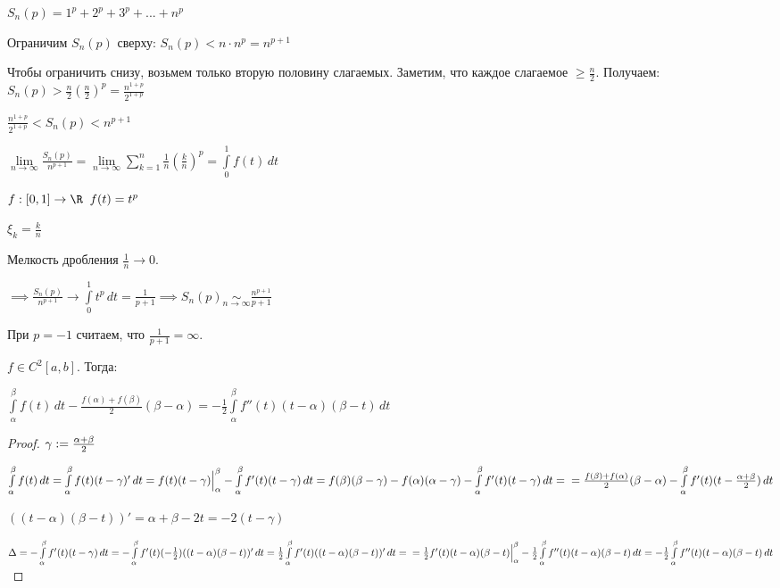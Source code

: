 
\begin{example}\slashns
	$S_n(p) = 1^p + 2^p + 3^p +...+n^p$
	
	Ограничим $S_n(p)$ сверху: $S_n(p) < n \cdot n^p = n^{p+1}$
	
	Чтобы ограничить снизу, возьмем только вторую половину слагаемых. Заметим, что каждое слагаемое $\geq\frac{n}{2}$. Получаем: $S_n(p) > \frac{n}{2} (\frac{n}{2})^p = \frac{n^{1+p}}{2^{1+p}}$
	
	$\frac{n^{1+p}}{2^{1+p}}  <S_n(p) < n^{p+1}$	
	
	$\lim\limits_{n \to \infty} \frac{S_n(p)}{n^{p+1}} = \lim\limits_{n \to \infty} \sum\limits_{k=1}^{n}\frac1n(\frac{k}{n})^p = \int\limits_0^1 f(t) \,dt$	
	
	$f: [0,1] \to \R \;\; f(t) = t^p$
	
	$\xi_k = \frac{k}{n}$
	
	Мелкость дробления $\frac1n \to 0$.
	
	$\implies\frac{S_n(p)}{n^{p+1}} \to \int\limits_0^1 t^p \,dt = \frac{1}{p+1}\implies S_n(p) \underset{n \to \infty}{\sim} \frac{n^{p + 1}}{p + 1}$	

	
	При $p=-1$ считаем, что $\frac1{p+1} = \infty$.
\end{example}

\begin{lemma}\slashns
    $f \in C^2[a,b]$. Тогда:

	$\int\limits_{\alpha}^{\beta} f(t) \, dt - \frac{f(\alpha) + f(\beta)}{2}(\beta - \alpha) = -\frac12 \int\limits_{\alpha}^{\beta} f''(t)(t-\alpha)(\beta - t) \, dt$	
\end{lemma}

\begin{proof}\slashns
	$\\ \gamma:= \frac{\alpha + \beta}{2}$
	
	$\int\limits_{\alpha}^{\beta} f(t) \, dt = \int\limits_{\alpha}^{\beta} f(t) (t - \gamma)'\, dt =  f(t)(t-\gamma) \Big|_{\alpha}^{\beta} - \int\limits_{\alpha}^{\beta} f'(t) (t - \gamma)\, dt
	= 
	f(\beta)(\beta-\gamma) - f(\alpha)(\alpha-\gamma) - \int\limits_{\alpha}^{\beta} f'(t) (t - \gamma)\, dt
	=\\=
	\frac{f(\beta) + f(\alpha)}{2}(\beta - \alpha)- \int\limits_{\alpha}^{\beta} f'(t) (t - \frac{\alpha+\beta}{2})\, dt$
	
	$((t-\alpha)(\beta - t))' = \alpha + \beta - 2t = -2(t - \gamma)$
	
	$\Delta = -\int\limits_{\alpha}^{\beta} f'(t)(t - \gamma)\, dt
	=
	-\int\limits_{\alpha}^{\beta} f'(t)(-\frac12)((t-\alpha)(\beta - t))'\, dt
	=\frac12\int\limits_{\alpha}^{\beta} f'(t)((t-\alpha)(\beta - t))'\, dt
	=\\=\frac12 f'(t)(t-\alpha)(\beta - t) \Big|_{\alpha}^{\beta} - \frac12 \int\limits_{\alpha}^{\beta} f''(t)(t-\alpha)(\beta - t) \, dt
	= -\frac12 \int\limits_{\alpha}^{\beta} f''(t)(t-\alpha)(\beta - t) \, dt$
\end{proof}

